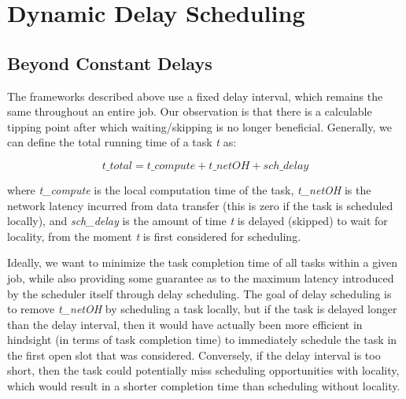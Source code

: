 \section{Dynamic Delay Scheduling}\label{sec:dynamic}

\subsection{Beyond Constant Delays}

The frameworks described above use a fixed delay interval, 
which remains the same throughout an entire job. Our observation is that there is a 
calculable tipping point after which waiting/skipping is no longer beneficial. Generally,
we can define the total running time of a task \textit{t} as:

\[
t\_total = t\_compute + t\_netOH + sch\_delay
\]

where \textit{t\_compute} is the local computation time of the task, \textit{t\_netOH}
is the network latency incurred from data transfer (this is zero if the task is scheduled 
locally), and \textit{sch\_delay} is the amount of time \textit{t} is delayed 
(skipped) to wait for locality, from the moment \textit{t} is first considered for 
scheduling.

Ideally, we want to minimize the task completion time of all tasks within a given job, 
while also providing some guarantee as to the maximum latency introduced by the scheduler
itself through delay scheduling. The goal of delay scheduling is to remove \textit{t\_netOH} by 
scheduling a task locally, but if the task is delayed longer than the delay interval, 
then it would have actually been more efficient in hindsight (in terms of task completion time) 
to immediately schedule the task in the first open slot that was considered. 
Conversely, if the delay interval is too short, then the task could potentially miss 
scheduling opportunities with locality, which would result in a shorter completion time
than scheduling without locality.

